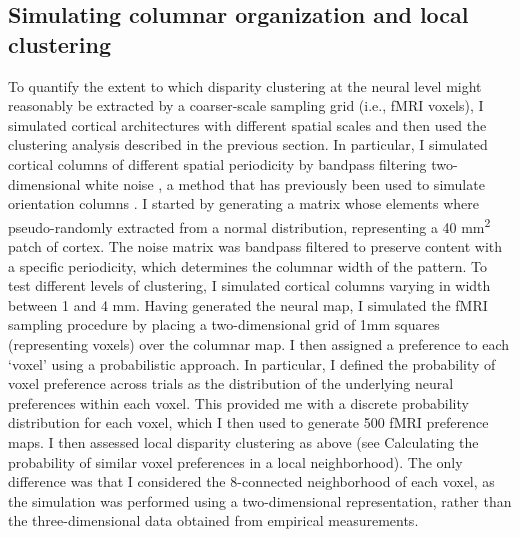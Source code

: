 \subsection{Simulating columnar organization and local clustering}
To quantify the extent to which disparity clustering at the neural level might reasonably be extracted by a coarser-scale sampling grid (i.e., fMRI voxels), I simulated cortical architectures with different spatial scales and then used the clustering analysis described in the previous section. In particular, I simulated cortical columns of different spatial periodicity by bandpass filtering two-dimensional white noise \cite{ROJER:1990bq}, a method that has previously been used to simulate orientation columns \cite{Boynton:2005bx}. I started by generating a matrix whose elements where pseudo-randomly extracted from a normal distribution, representing a 40 mm\textsuperscript{2} patch of cortex. The noise matrix was bandpass filtered to preserve content with a specific periodicity, which determines the columnar width of the pattern. To test different levels of clustering, I simulated cortical columns varying in width between 1 and 4 mm. Having generated the neural map, I simulated the fMRI sampling procedure by placing a two-dimensional grid of 1mm squares (representing voxels) over the columnar map. I then assigned a preference to each `voxel' using a probabilistic approach. In particular, I defined the probability of voxel preference across trials as the distribution of the underlying neural preferences within each voxel. This provided me with a discrete probability distribution for each voxel, which I then used to generate 500 fMRI preference maps. I then assessed local disparity clustering as above (see Calculating the probability of similar voxel preferences in a local neighborhood). The only difference was that I considered the 8-connected neighborhood of each voxel, as the simulation was performed using a two-dimensional representation, rather than the three-dimensional data obtained from empirical measurements.

